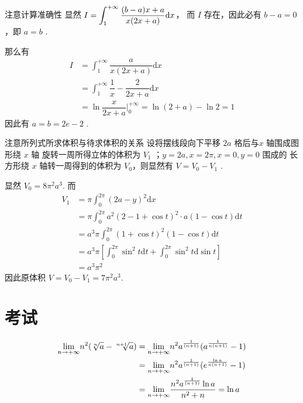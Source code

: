 \begin{answer}[660T68]{注意计算准确性}
    显然 $\displaystyle I = \int_1^{+\infty} \dfrac{(b-a)x + a}{x(2x+a)}\mathrm{d}x$，
    而 $ I $ 存在，因此必有 $ b - a = 0 $，即 $ a = b $ .

    那么有\begin{equation*}
        \begin{aligned}
            I &= \int_1^{+\infty} \dfrac{a}{x(2x+a)}\mathrm{d}x \\&=
            \int_1^{+\infty} \dfrac{1}{x} - \dfrac{2}{2x+a} \mathrm{d}x\\&=
            \ln \dfrac{x}{2x+a}\Big|^{+\infty}_0 = \ln(2+a) - \ln 2 = 1
        \end{aligned}
    \end{equation*} 
    因此有 $ a = b = 2e-2 $ .
\end{answer}

\begin{answer}[660T70]{注意所列式所求体积与待求体积的关系}
    设将摆线段向下平移 $ 2a $ 格后与$ x $ 轴围成图形绕 $ x $ 轴
    旋转一周所得立体的体积为 $ V_1 $ ；$ y = 2a,x = 2\pi,x = 0,y = 0 $ 围成的
    长方形绕 $ x $ 轴转一周得到的体积为 $ V_0 $，则显然有 $ V=V_0-V_1 $ .

    显然 $ V_0 = 8\pi^2a^3 $. 而\begin{equation*}
        \begin{aligned}
            V_1 &= \pi\int_0^{2\pi} (2a-y)^2 \mathrm{d}x
            \\&= \pi\int_0^{2\pi} a^2(2 - 1+\cos t)^2 \cdot a(1-\cos t) \mathrm{d}t
            \\& = a^3\pi\int_0^{2\pi} (1+\cos t)^2(1-\cos t) \mathrm{d}t
            \\&= a^3\pi\left[\int_0^{2\pi}\sin^2t\mathrm{d}t+
            \int_0^{2\pi}\sin^2t\mathrm{d}\sin t\right]
            \\& = a^3\pi^2
        \end{aligned}
    \end{equation*}
    因此原体积 $ V = V_0-V_1 = 7\pi^2a^3. $ 
\end{answer}

\section{考试}

\begin{Answer}
    \begin{equation*}
        \begin{aligned}
            \displaystyle {\displaystyle\lim_{n\rightarrow +\infty}}n^2(\sqrt[n]a-\sqrt[n+1]a)
            &= {\displaystyle\lim_{n\rightarrow +\infty}}n^2a^{\frac1{(n+1)}}(a^{\frac1{n(n+1)}}-1)\\ 
            &= {\displaystyle\lim_{n\rightarrow +\infty}}n^2a^{\frac1{(n+1)}}(e^{\frac{\ln a}{n(n+1)}}-1)\\ 
            &= {\displaystyle\lim_{n\rightarrow +\infty}}\frac{n^2a^{\frac1{(n+1)}}\ln a}{n^2+n} = \ln a
        \end{aligned}
    \end{equation*}    
\end{Answer}

